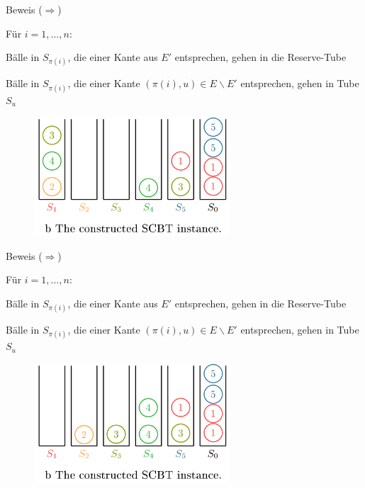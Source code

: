 \documentclass{beamer}
\begin{document}
\begin{frame}{Beweis (\glqq $\Rightarrow$\grqq)}
\begin{pointlist}
\item Für $i=1,\dots,n$:
\begin{arrowlist}
\item Bälle in $S_{\pi(i)}$, die einer Kante aus $E'$ entsprechen, gehen in die Reserve-Tube 
\item Bälle in $S_{\pi(i)}$, die einer Kante $(\pi(i),u)\in E\backslash E'$ entsprechen, gehen in Tube $S_u$
\end{arrowlist}
\end{pointlist}
\begin{figure}
    \centering
    \includegraphics[width=0.65\textwidth]{proofr2}
\end{figure}
\end{frame}

\begin{frame}{Beweis (\glqq $\Rightarrow$\grqq)}
\begin{pointlist}
\item Für $i=1,\dots,n$:
\begin{arrowlist}
\item Bälle in $S_{\pi(i)}$, die einer Kante aus $E'$ entsprechen, gehen in die Reserve-Tube 
\item Bälle in $S_{\pi(i)}$, die einer Kante $(\pi(i),u)\in E\backslash E'$ entsprechen, gehen in Tube $S_u$
\end{arrowlist}
\end{pointlist}
\begin{figure}
    \centering
    \includegraphics[width=0.65\textwidth]{proofr3}
\end{figure}
\end{frame}
\end{document}
